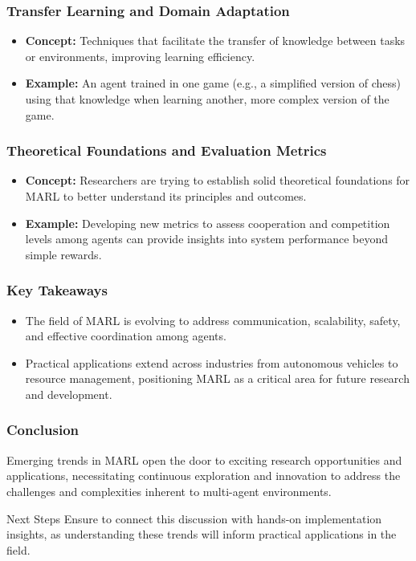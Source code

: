 \documentclass[aspectratio=169]{beamer}
\begin{document}
\begin{frame}[fragile]
    \frametitle{Transfer Learning and Domain Adaptation}
    \begin{itemize}
        \item \textbf{Concept:} Techniques that facilitate the transfer of knowledge between tasks or environments, improving learning efficiency.
        \item \textbf{Example:} An agent trained in one game (e.g., a simplified version of chess) using that knowledge when learning another, more complex version of the game.
    \end{itemize}
\end{frame}

\begin{frame}[fragile]
    \frametitle{Theoretical Foundations and Evaluation Metrics}
    \begin{itemize}
        \item \textbf{Concept:} Researchers are trying to establish solid theoretical foundations for MARL to better understand its principles and outcomes.
        \item \textbf{Example:} Developing new metrics to assess cooperation and competition levels among agents can provide insights into system performance beyond simple rewards.
    \end{itemize}
\end{frame}

\begin{frame}[fragile]
    \frametitle{Key Takeaways}
    \begin{itemize}
        \item The field of MARL is evolving to address communication, scalability, safety, and effective coordination among agents.
        \item Practical applications extend across industries from autonomous vehicles to resource management, positioning MARL as a critical area for future research and development.
    \end{itemize}
\end{frame}

\begin{frame}[fragile]
    \frametitle{Conclusion}
    Emerging trends in MARL open the door to exciting research opportunities and applications, necessitating continuous exploration and innovation to address the challenges and complexities inherent to multi-agent environments.

    \begin{block}{Next Steps}
        Ensure to connect this discussion with hands-on implementation insights, as understanding these trends will inform practical applications in the field.
    \end{block}
\end{frame}
\end{document}
